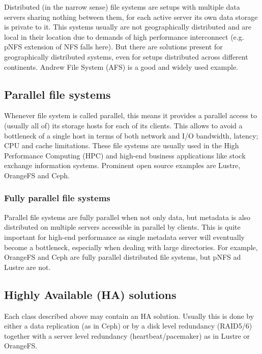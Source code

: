 \documentclass[10pt, a5paper]{article}
\begin{document}
{Distributed (in the narrow sense) file systems are setups with multiple data servers sharing nothing between them, for each active server its own data storage is private to it. This systems usually are not geographically distributed and are local in their location due to demands of high performance interconnect (e.g. pNFS\cite{bib3} extension of NFS\cite{bib2} falls here). But there are solutions present for geographically distributed systems, even for setups distributed across different continents. Andrew File System (AFS\cite{bib8}) is a good and widely used example.

\subsection*{Parallel file systems}

Whenever file system is called parallel, this means it provides a parallel access to (usually all of) its storage hosts for each of its clients. This allows to avoid a bottleneck of a single host in terms of both network and I/O bandwidth, latency; CPU and cache limitations. These file systems are usually used in the High Performance Computing (HPC\cite{bib2}\cite{bib9}) and high-end business applications like stock exchange information systems. Prominent open source examples are Lustre\cite{bib10}, OrangeFS\cite{bib11} and Ceph\cite{bib12}.

\subsubsection*{Fully parallel file systems}

Parallel file systems are fully parallel when not only data, but metadata is also distributed on multiple servers accessible in parallel by clients. This is quite important for high-end performance as single metadata server will eventually become a bottleneck, especially when dealing with large directories. For example, OrangeFS\cite{bib11} and Ceph\cite{bib12} are fully parallel distributed file systems, but pNFS\cite{bib4} ad Lustre\cite{bib10} are not.

\subsection*{Highly Available (HA) solutions}

Each class described above may contain an HA solution. Usually this is done by either a data replication (as in Ceph\cite{bib12}) or by a disk level redundancy (RAID5/6) together with a server level redundancy (heartbeat/pacemaker) as in Lustre\cite{bib10} or OrangeFS\cite{bib11}.

}
\end{document}
